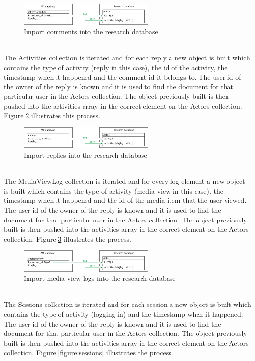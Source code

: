 \documentclass[11pt, oneside]{article}   	%
\begin{document}
\begin{figure}[h!]
  \centering
    \includegraphics[width=0.6\textwidth]{./activityDefinition.png}
      \caption{Import comments into the research database}
      \label{figure:activityDefinition}
\end{figure}
\\The Activities collection is iterated and for each reply a new object is built which contains the type of activity (reply in this case), the id of the activity, the timestamp when it happened and the comment id it belongs to. The user id of the owner of the reply is known and it is used to find the document for that particular user in the Actors collection. The object previously built is then pushed into the activities array in the correct element on the Actors collection. Figure \ref{figure:activity} illustrates this process.
\begin{figure}[h!]
  \centering
    \includegraphics[width=0.6\textwidth]{./activity.png}
      \caption{Import replies into the research database}
      \label{figure:activity}
\end{figure}
\\The MediaViewLog collection is iterated and for every log element a new object is built which contains the type of activity (media view in this case), the timestamp when it happened and the id of the media item that the user viewed. The user id of the owner of the reply is known and it is used to find the document for that particular user in the Actors collection. The object previously built is then pushed into the activities array in the correct element on the Actors collection. Figure \ref{figure:mediaViewLog} illustrates the process.
\begin{figure}[h!]
  \centering
    \includegraphics[width=0.6\textwidth]{./mediaLogView.png}
      \caption{Import media view logs into the research database}
      \label{figure:mediaViewLog}
\end{figure}
\\The Sessions collection is iterated and for each session a new object is built which contains the type of activity (logging in) and the timestamp when it happened. The user id of the owner of the reply is known and it is used to find the document for that particular user in the Actors collection. The object previously built is then pushed into the activities array in the correct element on the Actors collection. Figure \ref{figure:sessions} illustrates the process.
\end{document}
